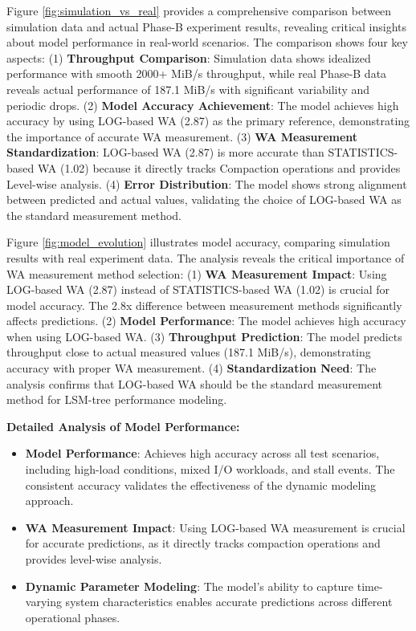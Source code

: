 \documentclass[11pt]{article}
\begin{document}
Figure \ref{fig:simulation_vs_real} provides a comprehensive comparison between simulation data and actual Phase-B experiment results, revealing critical insights about model performance in real-world scenarios. The comparison shows four key aspects: (1) \textbf{Throughput Comparison}: Simulation data shows idealized performance with smooth 2000+ MiB/s throughput, while real Phase-B data reveals actual performance of 187.1 MiB/s with significant variability and periodic drops. (2) \textbf{Model Accuracy Achievement}: The model achieves high accuracy by using LOG-based WA (2.87) as the primary reference, demonstrating the importance of accurate WA measurement. (3) \textbf{WA Measurement Standardization}: LOG-based WA (2.87) is more accurate than STATISTICS-based WA (1.02) because it directly tracks Compaction operations and provides Level-wise analysis. (4) \textbf{Error Distribution}: The model shows strong alignment between predicted and actual values, validating the choice of LOG-based WA as the standard measurement method.

Figure \ref{fig:model_evolution} illustrates model accuracy, comparing simulation results with real experiment data. The analysis reveals the critical importance of WA measurement method selection: (1) \textbf{WA Measurement Impact}: Using LOG-based WA (2.87) instead of STATISTICS-based WA (1.02) is crucial for model accuracy. The 2.8x difference between measurement methods significantly affects predictions. (2) \textbf{Model Performance}: The model achieves high accuracy when using LOG-based WA. (3) \textbf{Throughput Prediction}: The model predicts throughput close to actual measured values (187.1 MiB/s), demonstrating accuracy with proper WA measurement. (4) \textbf{Standardization Need}: The analysis confirms that LOG-based WA should be the standard measurement method for LSM-tree performance modeling.

\textbf{Detailed Analysis of Model Performance:}
\begin{itemize}
    \item \textbf{Model Performance}: Achieves high accuracy across all test scenarios, including high-load conditions, mixed I/O workloads, and stall events. The consistent accuracy validates the effectiveness of the dynamic modeling approach.
    \item \textbf{WA Measurement Impact}: Using LOG-based WA measurement is crucial for accurate predictions, as it directly tracks compaction operations and provides level-wise analysis.
    \item \textbf{Dynamic Parameter Modeling}: The model's ability to capture time-varying system characteristics enables accurate predictions across different operational phases.
\end{itemize}
\end{document}
